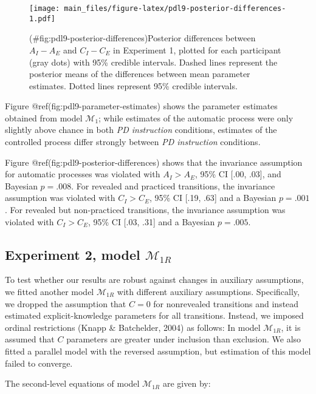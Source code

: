 \begin{appendix}
\begin{figure}
\centering
\texttt{[image: main\_files/figure-latex/pdl9-posterior-differences-1.pdf]}
\caption{(\#fig:pdl9-posterior-differences)Posterior differences between
\(A_I - A_E\) and \(C_I - C_E\) in Experiment 1, plotted for each
participant (gray dots) with 95\% credible intervals. Dashed lines
represent the posterior means of the differences between mean parameter
estimates. Dotted lines represent 95\% credible intervals.}
\end{figure}

Figure @ref(fig:pdl9-parameter-estimates) shows the parameter estimates
obtained from model \(\mathcal{M}_1\); while estimates of the automatic
process were only slightly above chance in both \emph{PD instruction}
conditions, estimates of the controlled process differ strongly between
\emph{PD instruction} conditions.

Figure @ref(fig:pdl9-posterior-differences) shows that the invariance
assumption for automatic processes was violated with \(A_I > A_E\), 95\%
CI {[}.00, .03{]}, and Bayesian \(p = .008\). For revealed and practiced
transitions, the invariance assumption was violated with \(C_I > C_E\),
95\% CI {[}.19, .63{]} and a Bayesian \(p = .001\). For revealed but
non-practiced transitions, the invariance assumption was violated with
\(C_I > C_E\), 95\% CI {[}.03, .31{]} and a Bayesian \(p = .005\).

\subsection{\texorpdfstring{Experiment 2, model
\(\mathcal{M}_{1R}\)}{Experiment 2, model \textbackslash{}mathcal\{M\}\_\{1R\}}}\label{experiment-2-model-mathcalm_1r}

To test whether our results are robust against changes in auxiliary
assumptions, we fitted another model \(\mathcal{M}_{1R}\) with different
auxiliary assumptions. Specifically, we dropped the assumption that
\(C=0\) for nonrevealed transitions and instead estimated
explicit-knowledge parameters for all transitions. Instead, we imposed
ordinal restrictions (Knapp \& Batchelder, 2004) as follows: In model
\(\mathcal{M}_{1R}\), it is assumed that \(C\) parameters are greater
under inclusion than exclusion. We also fitted a parallel model with the
reversed assumption, but estimation of this model failed to converge.

The second-level equations of model \(\mathcal{M}_{1R}\) are given by:


\end{appendix}
